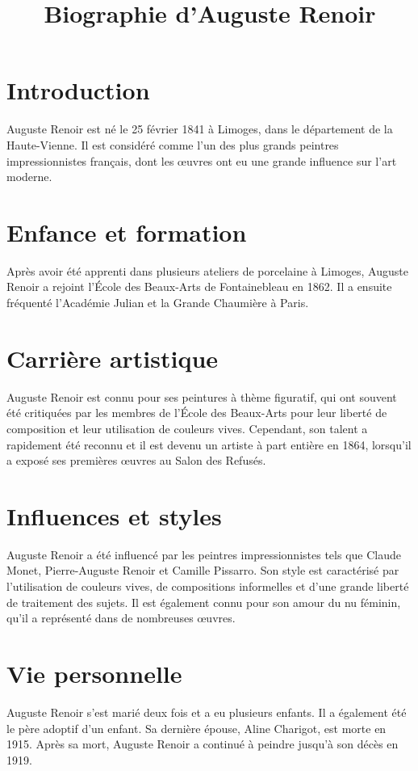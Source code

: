 \documentclass[12pt, a4paper]{article}
\title{Biographie d'Auguste Renoir}
\author{}
\date{}
\begin{document}
   \maketitle
   \section*{Introduction}
   \noindent
   Auguste Renoir est né le 25 février 1841 à Limoges, dans le département de la Haute-Vienne. Il est considéré comme l'un des plus grands peintres impressionnistes français, dont les œuvres ont eu une grande influence sur l'art moderne.
   \section*{Enfance et formation}
   \noindent
   Après avoir été apprenti dans plusieurs ateliers de porcelaine à Limoges, Auguste Renoir a rejoint l'École des Beaux-Arts de Fontainebleau en 1862. Il a ensuite fréquenté l'Académie Julian et la Grande Chaumière à Paris.
   \section*{Carrière artistique}
   \noindent
   Auguste Renoir est connu pour ses peintures à thème figuratif, qui ont souvent été critiquées par les membres de l'École des Beaux-Arts pour leur liberté de composition et leur utilisation de couleurs vives. Cependant, son talent a rapidement été reconnu et il est devenu un artiste à part entière en 1864, lorsqu'il a exposé ses premières œuvres au Salon des Refusés.
   \section*{Influences et styles}
   \noindent
   Auguste Renoir a été influencé par les peintres impressionnistes tels que Claude Monet, Pierre-Auguste Renoir et Camille Pissarro. Son style est caractérisé par l'utilisation de couleurs vives, de compositions informelles et d'une grande liberté de traitement des sujets. Il est également connu pour son amour du nu féminin, qu'il a représenté dans de nombreuses œuvres.
   \section*{Vie personnelle}
   \noindent
   Auguste Renoir s'est marié deux fois et a eu plusieurs enfants. Il a également été le père adoptif d'un enfant. Sa dernière épouse, Aline Charigot, est morte en 1915. Après sa mort, Auguste Renoir a continué à peindre jusqu'à son décès en 1919.
\end{document}
